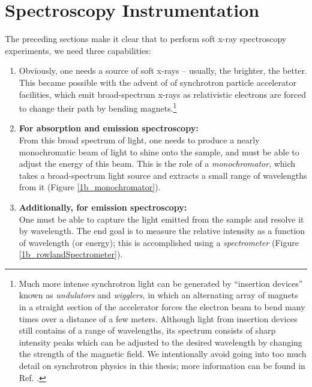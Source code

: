 \section{Spectroscopy Instrumentation}
The preceding sections make it clear that to perform soft x-ray spectroscopy experiments, we need three capabilities:
\begin{enumerate}
\item Obviously, one needs a source of soft x-rays -- usually, the brighter, the better.  This became possible with the advent of of synchrotron particle accelerator facilities, which emit broad-spectrum x-rays as relativistic electrons are forced to change their path by bending magnets.\footnote{Much more intense synchrotron light can be generated by ``insertion devices'' known as \emph{undulators} and \emph{wigglers}, in which an alternating array of magnets in a straight section of the accelerator forces the electron beam to bend many times over a distance of a few meters.  Although light from insertion devices still contains of a range of wavelengths, its spectrum consists of sharp intensity peaks which can be adjusted to the desired wavelength by changing the strength of the magnetic field.  We intentionally avoid going into too much detail on synchrotron physics in this thesis; more information can be found in Ref. \cite{Pea97}.}
\item \textbf{For absorption and emission spectroscopy:}\\
From this broad spectrum of light, one needs to produce a nearly monochromatic beam of light to shine onto the sample, and must be able to adjust the energy of this beam.  This is the role of a \emph{monochromator}, which takes a broad-spectrum light source and extracts a small range of wavelengths from it (Figure \ref{1b_monochromator}).
\item \textbf{Additionally, for emission spectroscopy:}\\
One must be able to capture the light emitted from the sample and resolve it by wavelength.  The end goal is to measure the relative intensity as a function of wavelength (or energy); this is accomplished using a \emph{spectrometer} (Figure \ref{1b_rowlandSpectrometer}).
\end{enumerate}

